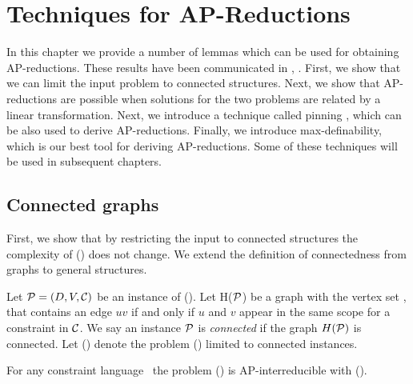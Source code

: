 \chapter{Techniques for AP-Reductions}
In this chapter we provide a number of lemmas which can be used for obtaining AP-reductions.
These results have been communicated in \cite{maxi}, \cite{mvl}\@.
First, we show that we can limit the input problem to connected structures. 
Next, we show that AP-reductions are possible when solutions for the two problems are related by a 
linear transformation. Next, we introduce a technique called pinning , which can be also used
to derive AP-reductions. Finally, we introduce max-definability, which 
is our best tool for deriving AP-reductions. Some of these techniques will be used in subsequent chapters. 

\section{Connected graphs}
First, we show that by restricting the input to connected structures the complexity of 
\ccsp(\mrelset) does not change. We extend the definition of connectedness from graphs
to general structures.

Let \(\mathcal{P} = (D, V, \mathcal{C})\) be an instance of \ccsp(\mrelset)\@.
Let H(\(\mathcal{P}\)) be a graph
with the vertex set \mV, that contains an edge \(uv\) if and only if 
\(u\) and \(v\) appear in the same scope for a constraint in \(\mathcal{C}\)\@.
We say an instance \(\mathcal{P}\) is \emph{connected} if the graph \(H(\mathcal{P})\) is connected.
Let \cccsp(\mrelset) denote the problem \ccsp(\mrelset) limited to connected instances.

\begin{lemma}\label{lem:connected}
For any constraint language \mrelset\ the problem \ccsp(\mrelset) is AP-interreducible with
\cccsp(\mrelset)\@.
\end{lemma}

